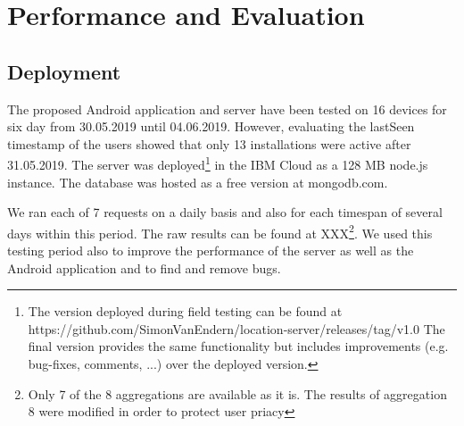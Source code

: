 \chapter{Performance and Evaluation}\label{chapter:performance}
\section{Deployment}
The proposed Android application and server have been tested on 16 devices for six day from 30.05.2019 until 04.06.2019. However, evaluating the lastSeen timestamp of the users showed that only 13 installations were active after 31.05.2019. The server was deployed\footnote{The version deployed during field testing can be found at https://github.com/SimonVanEndern/location-server/releases/tag/v1.0 The final version provides the same functionality but includes improvements (e.g. bug-fixes, comments, ...) over the deployed version.} in the IBM Cloud as a 128 MB node.js instance. The database was hosted as a free version at mongodb.com.

We ran each of 7 requests on a daily basis and also for each timespan of several days within this period. The raw results can be found at XXX\footnote{Only 7 of the 8 aggregations are available as it is. The results of aggregation 8 were modified in order to protect user priacy}. We used this testing period also to improve the performance of the server as well as the Android application and to find and remove bugs.

